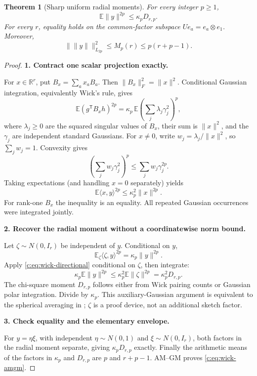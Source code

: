 \documentclass[11pt]{article}
\numberwithin{equation}{section}
\newtheorem{theorem}{Theorem}[section]
\theoremstyle{definition}\newtheorem{definition}[theorem]{Definition}
\theoremstyle{remark}\newtheorem{remark}[theorem]{Remark}
\newcommand{\R}{\mathbb R}\newcommand{\E}{\mathbb E}\newcommand{\Prob}{\mathbb P}
\newcommand{\norm}[1]{\lVert#1\rVert}\newcommand{\ip}[2]{\langle#1,#2\rangle}
\newcommand{\step}[1]{\par\addvspace{.65\baselineskip}\Needspace{4\baselineskip}\noindent\textbf{#1}\par\nobreak\smallskip}
\begin{document}
\begin{theorem}[Sharp uniform radial moments]\label{c:thm:wick-radial}
For every integer $p\ge1$,
\begin{equation}\label{c:eq:wick-radial}
 \boxed{\E\norm y^{2p}\le \kappa_pD_{r,p}.}
\end{equation}
For every $r$, equality holds on the common-factor subspace $Ue_a=e_a\otimes e_1$. Moreover,
\begin{equation}\label{c:eq:wick-amgm}
 \norm{\norm y}_{L_{2p}}^2\le M_p(r)\le p(r+p-1).
\end{equation}
\end{theorem}
\begin{proof}
\step{1. Contract one scalar projection exactly.}
For $x\in\R^r$, put $B_x=\sum_a x_a B_a$. Then $\norm{B_x}_F^2=\norm x^2$. Conditional Gaussian integration, equivalently Wick's rule, gives
\[
 \E(g^{\mathsf T}B_xh)^{2p}
 =\kappa_p\,\E\left(\sum_j\lambda_j\gamma_j^2\right)^p,
\]
where $\lambda_j\ge0$ are the squared singular values of $B_x$, their sum is $\norm x^2$, and the $\gamma_j$ are independent standard Gaussians. For $x\ne0$, write $w_j=\lambda_j/\norm x^2$, so $\sum_jw_j=1$.
Convexity gives
\[
 \left(\sum_jw_j\gamma_j^2\right)^p
 \le\sum_jw_j\gamma_j^{2p}.
\]
Taking expectations (and handling $x=0$ separately) yields
\begin{equation}\label{c:eq:wick-directional}
 \E\ip{x}{y}^{2p}\le \kappa_p^2\norm x^{2p}.
\end{equation}
For rank-one $B_x$ the inequality is an equality. All repeated Gaussian occurrences were integrated jointly.

\step{2. Recover the radial moment without a coordinatewise norm bound.}
Let $\zeta\sim N(0,I_r)$ be independent of $y$. Conditional on $y$,
\[
 \E_\zeta\ip{\zeta}{y}^{2p}=\kappa_p\norm y^{2p}.
\]
Apply \eqref{c:eq:wick-directional} conditional on $\zeta$, then integrate:
\[
 \kappa_p\E\norm y^{2p}\le \kappa_p^2\E\norm\zeta^{2p}=\kappa_p^2D_{r,p}.
\]
The chi-square moment $D_{r,p}$ follows either from Wick pairing counts or Gaussian polar integration. Divide by $\kappa_p$. This auxiliary-Gaussian argument is equivalent to the spherical averaging in \cite[projected radial moments]{RMPS}; $\zeta$ is a proof device, not an additional sketch factor.

\step{3. Check equality and the elementary envelope.}
For $y=\eta\xi$, with independent $\eta\sim N(0,1)$ and $\xi\sim N(0,I_r)$, both factors in the radial moment separate, giving $\kappa_pD_{r,p}$ exactly. Finally the arithmetic means of the factors in $\kappa_p$ and $D_{r,p}$ are $p$ and $r+p-1$. AM--GM proves \eqref{c:eq:wick-amgm}.
\end{proof}
\end{document}

